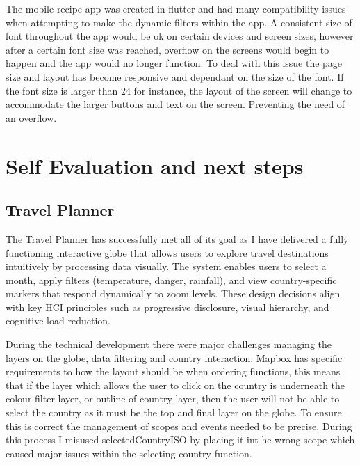 \documentclass[]{project_final}
\begin{document}
The mobile recipe app was created in flutter and had many compatibility issues when attempting to make the dynamic filters within the app. A consistent size of font throughout the app would be ok on certain devices and screen sizes, however after a certain font size was reached, overflow on the screens would begin to happen and the app would no longer function. To deal with this issue the page size and layout has become responsive and dependant on the size of the font. If the font size is larger than 24 for instance, the layout of the screen will change to accommodate the larger buttons and text on the screen. Preventing the need of an overflow.














\chapter{Self Evaluation and next steps}
\section{Travel Planner}
The Travel Planner has successfully met all of its goal as I have delivered a fully functioning interactive globe that allows users to explore travel destinations intuitively by processing data visually. The system enables users to select a month, apply filters (temperature, danger, rainfall), and view country-specific markers that respond dynamically to zoom levels. These design decisions align with key HCI principles such as progressive disclosure, visual hierarchy, and cognitive load reduction.

During the technical development there were major challenges managing the layers on the globe, data filtering and country interaction. Mapbox has specific requirements to how the layout should be when ordering functions, this means that if the layer which allows the user to click on the country is underneath the colour filter layer, or outline of country layer, then the user will not be able to select the country as it must be the top and final layer on the globe. To ensure this is correct the management of scopes and events needed to be precise. During this process I misused selectedCountryISO by placing it int he wrong scope which caused major issues within the selecting country function.
\end{document}

